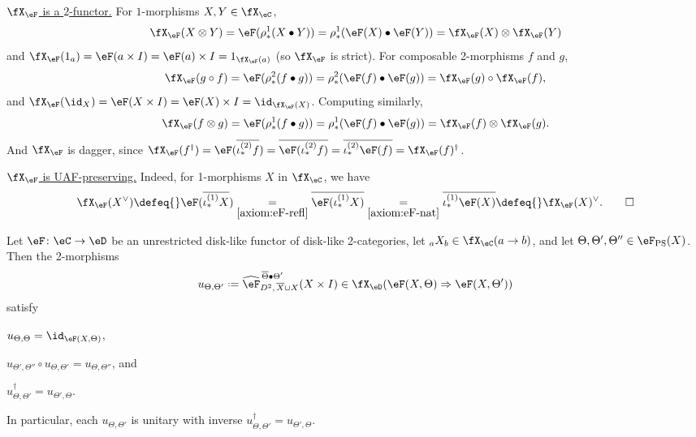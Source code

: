 \documentclass[12pt,reqno]{amsart}
\newcommand{\C}{\eC}
\newcommand{\D}{\eD}
\newcommand{\blt}{\bullet}
\newcommand{\fcj}[1]{\overline{#1}}
\newcommand{\orev}{\overline}
\newcommand{\itemstep}[1]{\smallskip\noindent\underline{#1}}
\DeclareRobustCommand{\coloneq}{\mathrel{\vcenter{\baselineskip0.5ex\lineskiplimit0pt\hbox{\scriptsize{\upshape.}}\hbox{\scriptsize{\upshape.}}}}=}
\begin{document}
\begin{pf}
\itemstep{$\fX_\eF$ is a $2$-functor.} For $1$-morphisms $X,Y\in\fX_\C$,
  \[
      \fX_\eF(X\otimes Y)
      =\eF(\rho^1_*(X\blt Y))
      =\rho^1_*(\eF(X)\blt\eF(Y))
      =\fX_\eF(X)\otimes \fX_\eF(Y)
  \]
  and $\fX_\eF(1_a)=\eF(a\times I)=\eF(a)\times I=1_{\fX_\eF(a)}$ (so $\fX_\eF$ is strict). For composable 2-morphisms $f$ and $g$, 
  \[
      \fX_\eF(g\circ f)
      =\eF(\rho^2_*(f\blt g))
      =\rho^2_*(\eF(f)\blt\eF(g))
      =\fX_\eF(g)\circ \fX_\eF(f),
  \]
  and $\fX_\eF(\id_X)=\eF(X\times I)=\eF(X)\times I=\id_{\fX_\eF(X)}$. Computing similarly,
  \[
      \fX_\eF(f\otimes g)
      =\eF(\rho^1_*(f\blt g))
      =\rho^1_*(\eF(f)\blt\eF(g))
      =\fX_\eF(f)\otimes \fX_\eF(g).
  \]
  And $\fX_\eF$ is dagger, since
  $\fX_\eF(f^\dag)
      =\eF(\fcj{\iota^{(2)}_*f})
      =\fcj{\eF(\iota^{(2)}_*f)}
      =\fcj{\iota^{(2)}_*\eF(f)}
      =\fX_\eF(f)^\dag$.

\itemstep{$\fX_\eF$ is UAF-preserving.} 
Indeed, for 1-morphisms $X$ in $\fX_\C$, we have
\[
  \fX_\eF(X^\vee)
  \defeq{}\eF(\fcj{\iota^{(1)}_*X})
  \underset{\ref{axiom:eF-refl}}{=}\fcj{\eF(\iota^{(1)}_*X)}
  \underset{\ref{axiom:eF-nat}}{=}\fcj{\iota^{(1)}_*\eF(X)}
  \defeq{}\fX_\eF(X)^\vee.\qedhere
\]
\end{pf}

\begin{lemma}
\label{lem:PS-change}
Let $\eF\colon\C\to\D$ be an unrestricted disk-like functor of disk-like 2-categories, let ${}_aX_b\in\fX_\C(a\to b)$, and let $\Theta,\Theta',\Theta''\in\eF_{\mathrm{PS}}(X)$. Then the 2-morphisms
\[
u_{\Theta,\Theta'}\coloneq\widehat\eF^{\,\orev\Theta\blt\Theta'}_{D^2,\,\fcj X\cup X}(X\times I)\in\fX_\D(\eF(X,\Theta)\Rightarrow\eF(X,\Theta'))
\]
satisfy
\begin{lst}
\item\label{cl:PS-change-id} $u_{\Theta,\Theta}=\id_{\eF(X,\Theta)}$,
\item\label{cl:PS-change-trans} $u_{\Theta',\Theta''}\circ u_{\Theta,\Theta'}=u_{\Theta,\Theta''}$, and
\item\label{cl:PS-change-dag} $u_{\Theta,\Theta'}^\dag=u_{\Theta',\Theta}$.
\end{lst}
In particular, each $u_{\Theta,\Theta'}$ is unitary with inverse $u_{\Theta,\Theta'}^\dag=u_{\Theta',\Theta}$.
\end{lemma}
\end{document}
